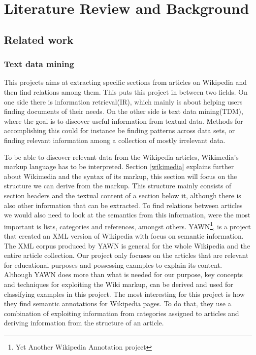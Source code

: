 
\chapter{Literature Review and Background}


\section{Related work}

\subsection{Text data mining} \label{sec_tdm}
This projects aims at extracting specific sections from articles on Wikipedia and then find relations among them. This puts this project in between two fields. On one side there is information retrieval(IR), which mainly is about helping users finding documents of their needs\cite{irbook}. On the other side is text data mining(TDM), where the goal is to discover useful information from textual data. Methods for accomplishing this could for instance be finding patterns across data sets, or finding relevant information among a collection of mostly irrelevant data\cite{untanglingTDM}.

To be able to discover relevant data from the Wikipedia articles, Wikimedia's markup language has to be interpreted. Section \ref{wikimedia} explains further about Wikimedia and the syntax of its markup, this section will focus on the structure we can derive from the markup. This structure mainly consists of section headers and the textual content of a section below it, although there is also other information that can be extracted. To find relations between articles we would also need to look at the semantics from this information, were the most important is lists, categories and references, amongst others. YAWN\footnote{Yet Another Wikipedia Annotation project}, is a project that created an XML version of Wikipedia with focus on semantic information\cite{yawn}. The XML corpus produced by YAWN is general for the whole Wikipedia and the entire article collection. Our project only focuses on the articles that are relevant for educational purposes and possessing examples to explain its content. Although YAWN does more than what is needed for our purpose, key concepts and techniques for exploiting the Wiki markup, can be derived and used for classifying examples in this project. The most interesting for this project is how they find semantic annotations for Wikipedia pages. To do that, they use a combination of exploiting information from categories assigned to articles and deriving information from the structure of an article.

